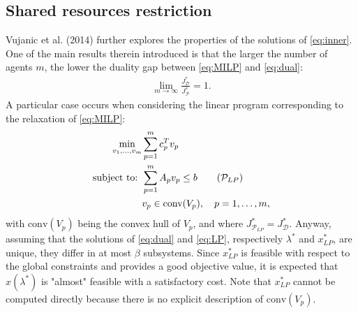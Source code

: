 \subsection{Shared resources restriction}
Vujanic et al. (2014)\supercite{vujanic} further explores the properties of the solutions of \ref{eq:inner}. One of the main results therein introduced is that the larger the number of agents $m$, the lower the duality gap between \ref{eq:MILP} and \ref{eq:dual}:
\begin{align*}
    \lim_{m \to \infty} \frac{J^*_{\mathcal{D}}}{J^*_{\mathcal{P}}} = 1.
\end{align*}
A particular case occurs when considering the linear program corresponding to the relaxation of \ref{eq:MILP}:
\begin{align*}
    \min_{v_1, \dots, v_m} & \sum_{p=1}^{m} c_p^T v_p                                             \\
    \text{subject to: }    & \sum_{p=1}^{m} A_p v_p \leq b \tag{$\mathcal{P}_{LP}$} \label{eq:LP} \\
                           & v_p \in \text{conv}(V_p), \quad p = 1, \dots, m,
\end{align*}
with $\text{conv}(V_p)$ being the convex hull of $V_p$, and where $J_{\mathcal{P}_{LP}}^* = J_{\mathcal{D}}^*$. Anyway, assuming that the solutions of \ref{eq:dual} and \ref{eq:LP}, respectively $\lambda^*$ and $x^*_{LP}$, are unique, they differ in at most $\beta$ subsystems. Since $x^*_{LP}$ is feasible with respect to the global constraints and provides a good objective value, it is expected that $x(\lambda^*)$ is "almost" feasible with a satisfactory cost. Note that $x_{LP}^*$ cannot be computed directly because there is no explicit description of $\text{conv}(V_p)$.


